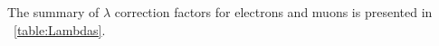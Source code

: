 The summary of $\lambda$ correction factors for electrons and muons is presented in \tablename~\ref{table:Lambdas}.
